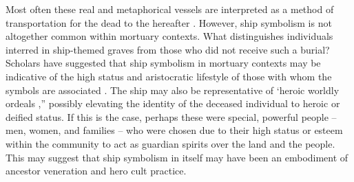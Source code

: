 Most often these real and metaphorical vessels are interpreted as a method of transportation for the dead to the hereafter \parencite[265]{Price_2008}.
However, ship symbolism is not altogether common within mortuary contexts. What distinguishes individuals interred in ship-themed graves from those who did not receive such a burial? Scholars have suggested that ship symbolism in mortuary contexts may be indicative of the high status and aristocratic lifestyle of those with whom the symbols are associated \parencites[61]{Hansson_1998}[68]{Herschend_2001}[4]{Williams_2010}.
The ship may also be representative of ‘heroic worldly ordeals \parencite[90]{Rundkvist_2008},” possibly elevating the identity of the deceased individual to heroic or deified status. If this is the case, perhaps these were special, powerful people – men, women, and families – who were chosen due to their high status or esteem within the community to act as guardian spirits over the land and the people. This may suggest that ship symbolism in itself may have been an embodiment of ancestor veneration and hero cult practice.

